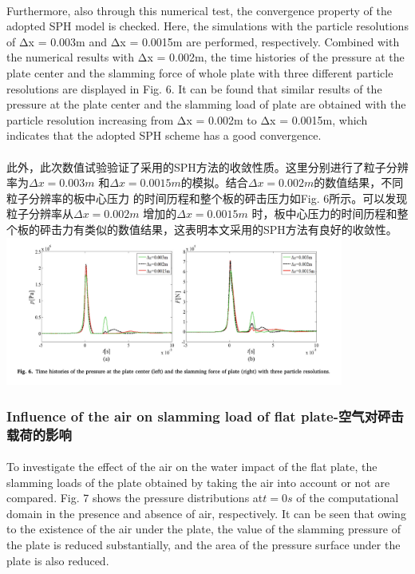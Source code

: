 \documentclass[UTF8]{ctexart}
\begin{document}
\paragraph{\quad}Furthermore, also through this numerical test, the convergence property of the 
                adopted SPH model is checked. Here, the simulations with the particle resolutions 
                of Δx = 0.003m and Δx = 0.0015m are performed, respectively. Combined with the 
                numerical results with Δx = 0.002m, the time histories of the pressure at the plate 
                center and the slamming force of whole plate with three different particle resolutions 
                are displayed in Fig. 6. It can be found that similar results of the pressure at the 
                plate center and the slamming load of plate are obtained with the particle resolution 
                increasing from Δx = 0.002m to Δx = 0.0015m, which indicates that the adopted SPH 
                scheme has a good convergence.
\paragraph{\quad}此外，此次数值试验验证了采用的SPH方法的收敛性质。这里分别进行了粒子分辨率为$\Delta x = 0.003m$
                和$\Delta x = 0.0015m$的模拟。结合$\Delta x = 0.002 m$的数值结果，不同粒子分辨率的板中心压力
                的时间历程和整个板的砰击压力如Fig. 6所示。可以发现粒子分辨率从$\Delta x = 0.002m$ 增加的$\Delta x = 0.0015m$
                时，板中心压力的时间历程和整个板的砰击力有类似的数值结果，这表明本文采用的SPH方法有良好的收敛性。\\
{
    \centering
    \includegraphics[width=30em]{./source/Fig6.png}
}
\subsubsection{Influence of the air on slamming load of flat plate-空气对砰击载荷的影响}
\paragraph{\quad}To investigate the effect of the air on the water impact of the flat plate, 
            the slamming loads of the plate obtained by taking the air into account or not are 
            compared. Fig. 7 shows the pressure distributions at$t = 0s$ of the computational 
            domain in the presence and absence of air, respectively. It can be seen that owing 
            to the existence of the air under the plate, the value of the slamming pressure of 
            the plate is reduced substantially, and the area of the pressure surface under the 
            plate is also reduced.
\end{document}
